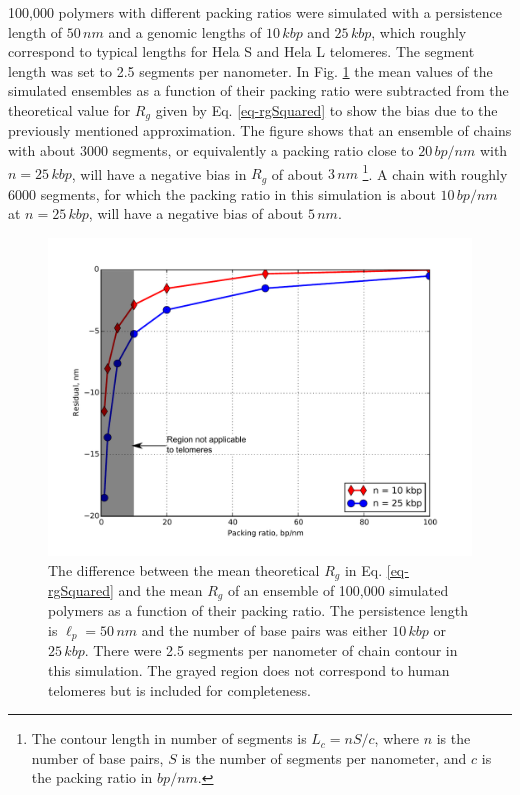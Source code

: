 \documentclass[12pt, a4paper]{article}
\begin{document}
100,000 polymers with different packing ratios were simulated with
a persistence length of $50 \, nm$ and a genomic lengths of $10 \,
    kbp$ and $25 \, kbp$, which roughly correspond to typical lengths
for Hela S and Hela L telomeres. The segment length was set to 2.5
segments per nanometer. In Fig. \ref{fig-simAccuracy} the mean
values of the simulated ensembles as a function of their packing
ratio were subtracted from the theoretical value for $R_g$ given
by Eq. \eqref{eq-rgSquared} to show the bias due to the previously
mentioned approximation. The figure shows that an ensemble of
chains with about 3000 segments, or equivalently a packing ratio
close to $20 \, bp/nm$ with $n = 25 \, kbp$, will have a negative
bias in $R_g$ of about $3 \, nm$ \footnote{The contour length in number of segments is $L_c = nS/c$, where
$n$ is the number of base pairs, $S$ is the number of segments per
nanometer, and $c$ is the packing ratio in $bp/nm$.}. A chain with roughly 6000
segments, for which the packing ratio in this simulation is about
$10 \, bp/nm$ at $n = 25 \, kbp$, will have a negative bias of
about $5 \, nm$.

\begin{figure}
  \centering
  \includegraphics[scale = 0.6]{fig-simulation_accuracy.pdf}
  \caption{The difference between the mean theoretical $R_g$ in Eq. \eqref{eq-rgSquared} and the mean $R_g$ of an ensemble of 100,000 simulated polymers as a function of their packing ratio. The persistence length is $\ell_p = 50 \, nm$ and the number of base pairs was either $10 \, kbp$ or $25 \, kbp$. There were 2.5 segments per nanometer of chain contour in this simulation. The grayed region does not correspond to human telomeres but is included for completeness.}
  \label{fig-simAccuracy}
\end{figure}
\end{document}
